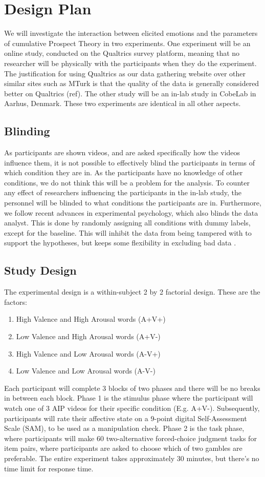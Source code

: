 \documentclass{article}
\begin{document}
    
    \section{Design Plan}
    We will investigate the interaction between elicited emotions and the parameters of cumulative Prospect Theory in two experiments. One experiment will be an online study, conducted on the Qualtrics survey platform, meaning that no researcher will be physically with the participants when they do the experiment. The justification for using Qualtrics as our data gathering website over other similar sites such as MTurk is that the quality of the data is generally considered better on Qualtrics (ref). 
The other study will be an in-lab study in CobeLab in Aarhus, Denmark. These two experiments are identical in all other aspects. 

    \subsection{Blinding}
    As participants are shown videos, and are asked specifically how the videos influence them, it is not possible to effectively blind the participants in terms of which condition they are in. As the participants have no knowledge of other conditions, we do not think this will be a problem for the analysis. To counter any effect of researchers influencing the participants in the in-lab study, the personnel will be blinded to what conditions the participants are in. Furthermore, we follow recent advances in experimental psychology, which also blinds the data analyst. This is done by randomly assigning all conditions with dummy labels, except for the baseline. This will inhibit the data from being tampered with to support the hypotheses, but keeps some flexibility in excluding bad data \cite{dutilh2019flexible}. 
    \subsection{Study Design}
    The experimental design is a within-subject 2 by 2 factorial design. These are the factors: 
\begin{enumerate}
    \item High Valence and High Arousal words (A+V+)
    \item Low Valence and High Arousal words (A+V-)
    \item High Valence and Low Arousal words (A-V+)
    \item Low Valence and Low Arousal words (A-V-)
\end{enumerate}
Each participant will complete 3 blocks of two phases and there will be no breaks in between each block. Phase 1 is the stimulus phase where the participant will watch one of 3 AIP videos for their specific condition (E.g. A+V-). Subsequently, participants will rate their affective state on a 9-point digital Self-Assessment Scale (SAM), to be used as a manipulation check. 
Phase 2 is the task phase, where participants will make 60 two-alternative forced-choice judgment tasks for item pairs, where participants are asked to choose which of two gambles are preferable. 
The entire experiment takes approximately 30 minutes, but there’s no time limit for response time.
\end{document}

